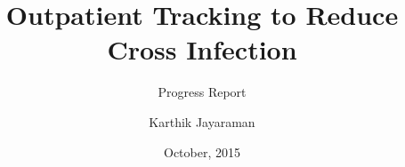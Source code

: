\documentclass{beamer}
\title[Thesis Presentation]{Outpatient Tracking to Reduce Cross Infection}
\subtitle{Progress Report}
\author{Karthik Jayaraman}
\institute{University of New South Wales}
\date{\nth{29} October, 2015}
\begin{document}
\begin{frame}
  \titlepage
\end{frame}







\end{document}
